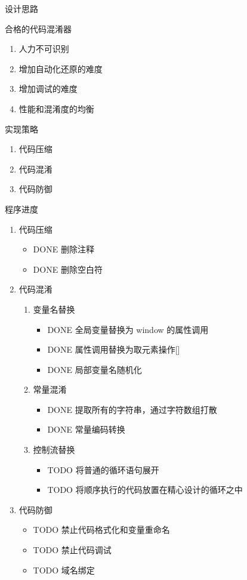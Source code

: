 \documentclass[presentation]{beamer}
\begin{document}
\begin{frame}[label=sec-4]{设计思路}
\begin{block}{合格的代码混淆器}
\begin{enumerate}
\item 人力不可识别
\item 增加自动化还原的难度
\item 增加调试的难度
\item 性能和混淆度的均衡
\end{enumerate}
\end{block}
\begin{block}{实现策略}
\begin{enumerate}
\item 代码压缩
\item 代码混淆
\item 代码防御
\end{enumerate}
\end{block}
\end{frame}
\begin{frame}[label=sec-5]{程序进度}
\begin{enumerate}
\item 代码压缩
\begin{itemize}
\item \alert{DONE} 删除注释
\item \alert{DONE} 删除空白符
\end{itemize}
\item 代码混淆
\begin{enumerate}
\item 变量名替换
\begin{itemize}
\item \alert{DONE} 全局变量替换为 window 的属性调用
\item \alert{DONE} 属性调用替换为取元素操作[]
\item \alert{DONE} 局部变量名随机化
\end{itemize}
\item 常量混淆
\begin{itemize}
\item \alert{DONE} 提取所有的字符串，通过字符数组打散
\item \alert{DONE} 常量编码转换
\end{itemize}
\item 控制流替换
\begin{itemize}
\item \alert{TODO} 将普通的循环语句展开
\item \alert{TODO} 将顺序执行的代码放置在精心设计的循环之中
\end{itemize}
\end{enumerate}
\item 代码防御
\begin{itemize}
\item \alert{TODO} 禁止代码格式化和变量重命名
\item \alert{TODO} 禁止代码调试
\item \alert{TODO} 域名绑定
\end{itemize}
\end{enumerate}
\end{frame}
\end{document}
